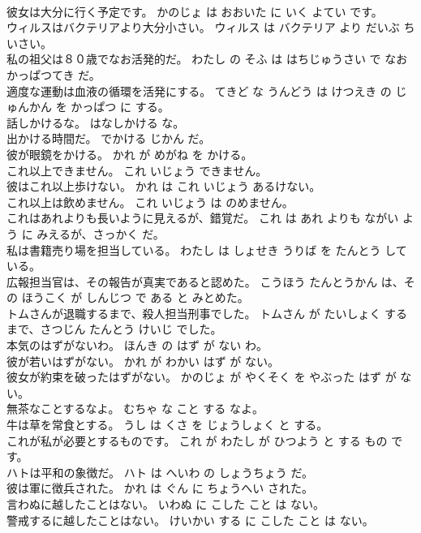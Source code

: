 \documentclass[8pt]{extreport}
\begin{document}
\begin{CJK}{UTF8}{min}
\\	彼女は大分に行く予定です。	かのじょ は おおいた に いく よてい です。	
\\	ウィルスはバクテリアより大分小さい。	ウィルス は バクテリア より だいぶ ちいさい。	
\\	私の祖父は８０歳でなお活発的だ。	わたし の そふ は はちじゅうさい で なお かっぱつてき だ。	
\\	適度な運動は血液の循環を活発にする。	てきど な うんどう は けつえき の じゅんかん を かっぱつ に する。	
\\	話しかけるな。	はなしかける な。	
\\	出かける時間だ。	でかける じかん だ。	
\\	彼が眼鏡をかける。	かれ が めがね を かける。	
\\	これ以上できません。	これ いじょう できません。	
\\	彼はこれ以上歩けない。	かれ は これ いじょう あるけない。	
\\	これ以上は飲めません。	これ いじょう は のめません。	
\\	これはあれよりも長いように見えるが、錯覚だ。	これ は あれ よりも ながい よう に みえるが、さっかく だ。	
\\	私は書籍売り場を担当している。	わたし は しょせき うりば を たんとう している。	
\\	広報担当官は、その報告が真実であると認めた。	こうほう たんとうかん は、その ほうこく が しんじつ で ある と みとめた。	
\\	トムさんが退職するまで、殺人担当刑事でした。	トムさん が たいしょく する まで、さつじん たんとう けいじ でした。	
\\	本気のはずがないわ。	ほんき の はず が ない わ。	
\\	彼が若いはずがない。	かれ が わかい はず が ない。	
\\	彼女が約束を破ったはずがない。	かのじょ が やくそく を やぶった はず が ない。	
\\	無茶なことするなよ。	むちゃ な こと する なよ。	
\\	牛は草を常食とする。	うし は くさ を じょうしょく と する。	
\\	これが私が必要とするものです。	これ が わたし が ひつよう と する もの です。	
\\	ハトは平和の象徴だ。	ハト は へいわ の しょうちょう だ。	
\\	彼は軍に徴兵された。	かれ は ぐん に ちょうへい された。	
\\	言わぬに越したことはない。	いわぬ に こした こと は ない。	
\\	警戒するに越したことはない。	けいかい する に こした こと は ない。	

\end{CJK}
\end{document}
